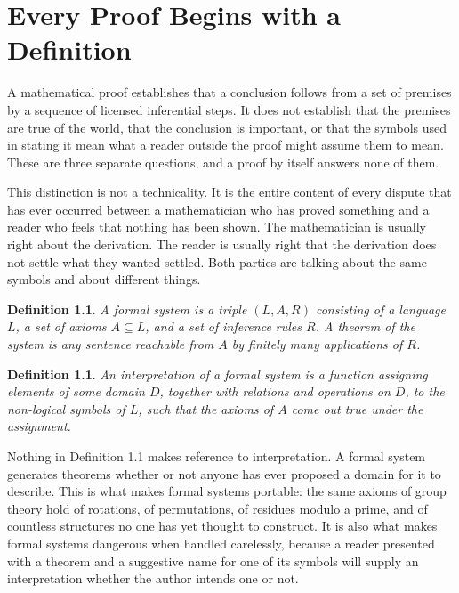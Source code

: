 \documentclass[11pt]{book}
\newtheorem{definition}[theorem]{Definition}
\begin{document}
\chapter{Every Proof Begins with a Definition}

A mathematical proof establishes that a conclusion follows from a set of premises by a sequence of licensed inferential steps. It does not establish that the premises are true of the world, that the conclusion is important, or that the symbols used in stating it mean what a reader outside the proof might assume them to mean. These are three separate questions, and a proof by itself answers none of them.

This distinction is not a technicality. It is the entire content of every dispute that has ever occurred between a mathematician who has proved something and a reader who feels that nothing has been shown. The mathematician is usually right about the derivation. The reader is usually right that the derivation does not settle what they wanted settled. Both parties are talking about the same symbols and about different things.

\begin{definition}
A \emph{formal system} is a triple $(L, A, R)$ consisting of a language $L$, a set of axioms $A \subseteq L$, and a set of inference rules $R$. A \emph{theorem} of the system is any sentence reachable from $A$ by finitely many applications of $R$.
\end{definition}

\begin{definition}
An \emph{interpretation} of a formal system is a function assigning elements of some domain $D$, together with relations and operations on $D$, to the non-logical symbols of $L$, such that the axioms of $A$ come out true under the assignment.
\end{definition}

Nothing in Definition 1.1 makes reference to interpretation. A formal system generates theorems whether or not anyone has ever proposed a domain for it to describe. This is what makes formal systems portable: the same axioms of group theory hold of rotations, of permutations, of residues modulo a prime, and of countless structures no one has yet thought to construct. It is also what makes formal systems dangerous when handled carelessly, because a reader presented with a theorem and a suggestive name for one of its symbols will supply an interpretation whether the author intends one or not.
\end{document}
